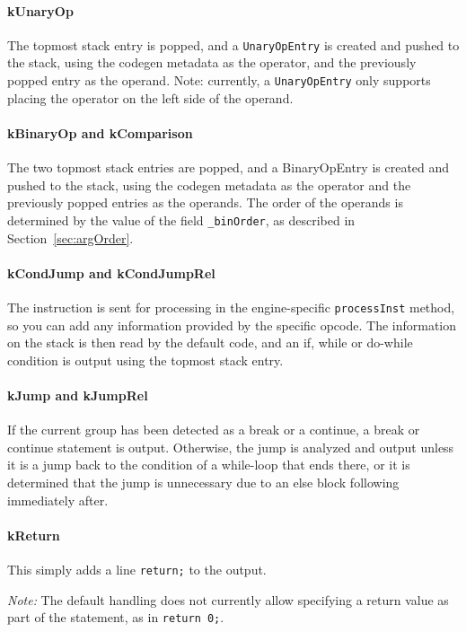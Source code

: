 \paragraph{kUnaryOp}
The topmost stack entry is popped, and a \verb+UnaryOpEntry+ is created and pushed to the stack, using the codegen metadata as the operator, and the previously popped entry as the operand. Note: currently, a \verb+UnaryOpEntry+ only supports placing the operator on the left side of the operand.

\paragraph{kBinaryOp and kComparison}
The two topmost stack entries are popped, and a BinaryOpEntry is created and pushed to the stack, using the codegen metadata as the operator and the previously popped entries as the operands. The order of the operands is determined by the value of the field \verb+_binOrder+, as described in Section~\vref{sec:argOrder}.

\paragraph{kCondJump and kCondJumpRel}
The instruction is sent for processing in the engine-specific \verb+processInst+ method, so you can add any information provided by the specific opcode. The information on the stack is then read by the default code, and an if, while or do-while condition is output using the topmost stack entry.

\paragraph{kJump and kJumpRel}
If the current group has been detected as a break or a continue, a break or continue statement is output. Otherwise, the jump is analyzed and output unless it is a jump back to the condition of a while-loop that ends there, or it is determined that the jump is unnecessary due to an else block following immediately after.

\paragraph{kReturn}
This simply adds a line \verb+return;+ to the output.

\emph{Note:} The default handling does not currently allow specifying a return value as part of the statement, as in \verb+return 0;+.

